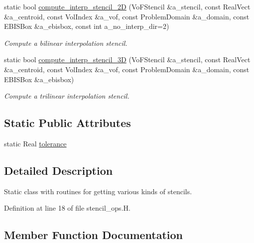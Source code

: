 \begin{DoxyCompactItemize}
static bool \hyperlink{classstencil__ops_a8391f3b781f4ef5266bffb2d63d503df}{compute\+\_\+interp\+\_\+stencil\+\_\+2D} (Vo\+F\+Stencil \&a\+\_\+stencil, const Real\+Vect \&a\+\_\+centroid, const Vol\+Index \&a\+\_\+vof, const Problem\+Domain \&a\+\_\+domain, const E\+B\+I\+S\+Box \&a\+\_\+ebisbox, const int a\+\_\+no\+\_\+interp\+\_\+dir=2)
\begin{DoxyCompactList}\small\item\em Compute a bilinear interpolation stencil. \end{DoxyCompactList}\item 
static bool \hyperlink{classstencil__ops_a10831a63321f57dee52b3c4731e20d41}{compute\+\_\+interp\+\_\+stencil\+\_\+3D} (Vo\+F\+Stencil \&a\+\_\+stencil, const Real\+Vect \&a\+\_\+centroid, const Vol\+Index \&a\+\_\+vof, const Problem\+Domain \&a\+\_\+domain, const E\+B\+I\+S\+Box \&a\+\_\+ebisbox)
\begin{DoxyCompactList}\small\item\em Compute a trilinear interpolation stencil. \end{DoxyCompactList}\end{DoxyCompactItemize}
\subsection*{Static Public Attributes}
\begin{DoxyCompactItemize}
\item 
static Real \hyperlink{classstencil__ops_a73be0c634e7d8f1ae48b22a1661f0694}{tolerance}
\end{DoxyCompactItemize}


\subsection{Detailed Description}
Static class with routines for getting various kinds of stencils. 

Definition at line 18 of file stencil\+\_\+ops.\+H.



\subsection{Member Function Documentation}
